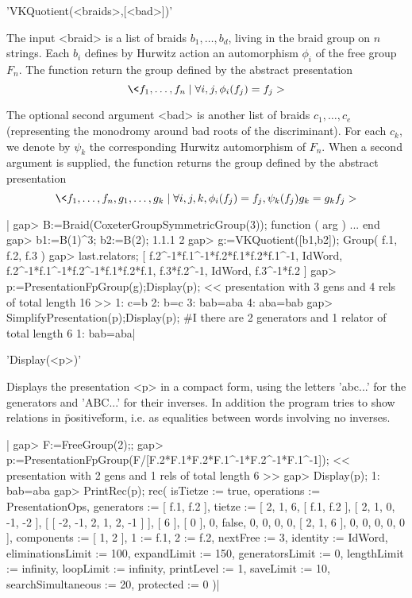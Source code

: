 
'VKQuotient(<braids>,[<bad>])'

The input  <braid> is a  list of  braids $b_1,\dots,b_d$, living  in the
braid group  on $n$ strings.  Each $b_i$  defines by Hurwitz  action an
automorphism $\phi_i$ of  the free group $F_n$. The  function return the
group  defined by  the abstract  presentation\: $$\<  f_1,\dots,f_n \mid
\forall i,j, \phi_i(f_j)=f_j > $$

The  optional   second  argument  <bad>   is  another  list   of  braids
$c_1,\dots,c_e$  (representing the  monodromy  around bad  roots of  the
discriminant). For each  $c_k$, we denote by  $\psi_k$ the corresponding
Hurwitz automorphism of  $F_n$. When a second argument  is supplied, the
function  returns  the  group  defined by  the  abstract  presentation\:
$$\<  f_1,\dots,f_n,g_1,\dots,g_k \mid  \forall i,j,k,  \phi_i(f_j)=f_j,
\psi_k(f_j) g_k=g_k f_j > $$


|    gap> B:=Braid(CoxeterGroupSymmetricGroup(3));
    function ( arg ) ... end
    gap> b1:=B(1)^3; b2:=B(2);                   
    1.1.1
    2
    gap> g:=VKQuotient([b1,b2]);                 
    Group( f.1, f.2, f.3 )
    gap>  last.relators;  
    [ f.2^-1*f.1^-1*f.2*f.1*f.2*f.1^-1, IdWord,
      f.2^-1*f.1^-1*f.2^-1*f.1*f.2*f.1, f.3*f.2^-1, IdWord, f.3^-1*f.2 ]
    gap> p:=PresentationFpGroup(g);Display(p);
    << presentation with 3 gens and 4 rels of total length 16 >>
    1: c=b
    2: b=c
    3: bab=aba
    4: aba=bab
    gap> SimplifyPresentation(p);Display(p);
    #I  there are 2 generators and 1 relator of total length 6
    1: bab=aba|


'Display(<p>)'

Displays  the presentation  <p> in  a  compact form,  using the  letters
'abc...' for the generators and 'ABC...' for their inverses. In addition
the  program tries  to  show  relations in  \"positive\"  form, i.e.  as
equalities between words involving no inverses.

|    gap> F:=FreeGroup(2);;
    gap> p:=PresentationFpGroup(F/[F.2*F.1*F.2*F.1^-1*F.2^-1*F.1^-1]);
    << presentation with 2 gens and 1 rels of total length 6 >>
    gap> Display(p);
    1: bab=aba
    gap> PrintRec(p);
    rec(
      isTietze           := true,
      operations         := PresentationOps,
      generators         := [ f.1, f.2 ],
      tietze             := [ 2, 1, 6, [ f.1, f.2 ], [ 2, 1, 0, -1, -2 ], 
      [ [ -2, -1, 2, 1, 2, -1 ] ], [ 6 ], [ 0 ], 0, false, 0, 0, 0, 0, 
      [ 2, 1, 6 ], 0, 0, 0, 0, 0 ],
      components         := [ 1, 2 ],
      1                  := f.1,
      2                  := f.2,
      nextFree           := 3,
      identity           := IdWord,
      eliminationsLimit  := 100,
      expandLimit        := 150,
      generatorsLimit    := 0,
      lengthLimit        := infinity,
      loopLimit          := infinity,
      printLevel         := 1,
      saveLimit          := 10,
      searchSimultaneous := 20,
      protected          := 0 )|

